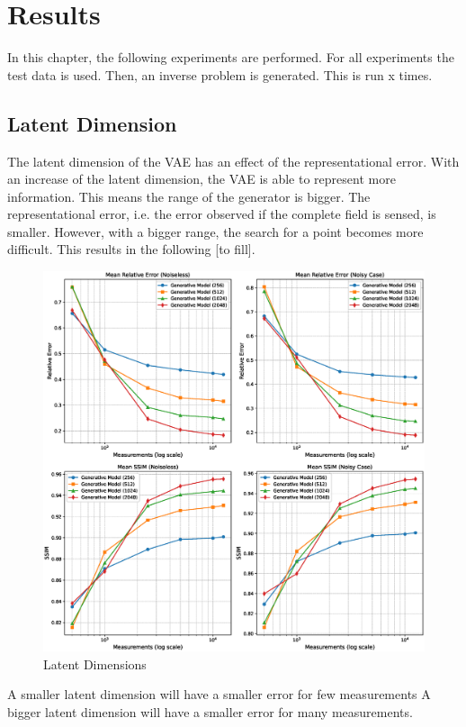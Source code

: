 
\chapter{Results}\label{chapter:results}
In this chapter, the following experiments are performed.
For all experiments the test data is used.
Then, an inverse problem is generated.
This is run x times.

\section{Latent Dimension}
The latent dimension of the VAE has an effect of the representational error.
With an increase of the latent dimension, the VAE is able to represent more information.
This means the range of the generator is bigger.
The representational error, i.e. the error observed if the complete field is sensed, is smaller.
However, with a bigger range, the search for a point becomes more difficult.
This results in the following [to fill].
\begin{figure}[h!]
    \centering
    \includegraphics[width=\textwidth]{figures/06_results/latent_dimension.eps}
    \caption{Latent Dimensions}
\end{figure}
A smaller latent dimension will have a smaller error for few measurements
A bigger latent dimension will have a smaller error for many measurements.

